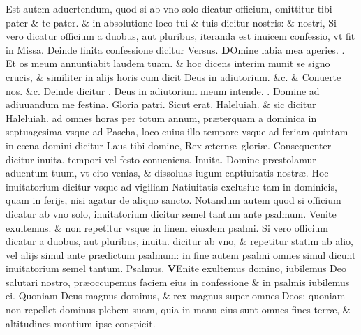 \documentclass[a5paper,10pt]{book}
\def\ae{æ}
\def\oe{œ}
\begin{document}
\begin{multicols*}{2}
Est autem aduertendum, quod si ab vno solo dicatur officium, omittitur \color{black} tibi pater \color{red} \& \color{black} te pater. \color{red} \& in absolutione loco \color{black} tui \color{red} \& \color{black} tuis \color{red} dicitur \color{black} nostris: \color{red} \& \color{black} nostri, \color{red} Si vero dicatur officium a duobus, aut pluribus, iteranda %
est inuicem confessio, vt fit in Missa. \color{black}
\newline {} \color{red} Deinde finita confessione dicitur Versus. \color{black}
\lettrine[lines=2]{\bfseries \color{red} D}{}Omine labia mea aperies. \color{red} \Rbar . \color{black} Et os meum annuntiabit laudem tuam.
\color{red} \& hoc dicens interim munit se signo crucis, \& similiter in alijs horis cum dicit \color{black} Deus in adiutorium. \color{red} \&c. \& \color{black} Conuerte nos. \color{red} \&c. \color{black}
\newline {} \color{red} Deinde dicitur \Vbar . \color{black} Deus in adiutorium meum intende. \color{red} \Rbar . \color{black} Domine ad adiuuandum me festina. Gloria patri. Sicut erat. Haleluiah. \color{red} \& sic dicitur \color{black} Haleluiah. \color{red} ad omnes horas per totum annum, pr\ae terquam a dominica in septuagesima vsque ad Pascha, loco cuius illo tempore vsque ad feriam quintam in c\oe na domini dicitur \color{black} Laus tibi domine, Rex \ae tern\ae \ glori\ae . \color{red} Consequenter dicitur inuita. tempori vel festo conueniens. Inuita. \color{black} Domine pr\ae stolamur aduentum tuum, vt cito venias, \& dissoluas iugum captiuitatis nostr\ae .
\newline {} \color{red} Hoc inuitatorium dicitur vsque ad vigiliam Natiuitatis exclusiue tam in dominicis, quam in ferijs, nisi agatur de aliquo sancto.\color{black}
\newline {} \color{red} Notandum autem quod si officium dicatur ab vno solo, inuitatorium dicitur semel tantum ante psalmum. \color{black} Venite exultemus. \color{red} \& non repetitur vsque in finem eiusdem psalmi. Si vero officium dicatur a duobus, aut pluribus, inuita. dicitur ab vno, \& repetitur statim ab alio, vel alijs simul ante pr\ae dictum psalmum: 
in fine autem psalmi omnes simul dicunt inuitatorium semel tantum. Psalmus. \color{black}
\vspace{-.25em}
\lettrine[lines=2]{\bfseries \color{red} V}{}Enite exultemus domino, iubilemus Deo salutari nostro, pr\ae occupemus faciem eius in confessione \& in psalmis iubilemus ei.
\newline \color{red} Q\color{black}uoniam Deus magnus dominus, \& rex magnus super omnes Deos: quoniam non repellet dominus plebem suam, quia in manu eius sunt omnes fines terr\ae , \& altitudines montium ipse conspicit.

\end{multicols*}
\end{document}
